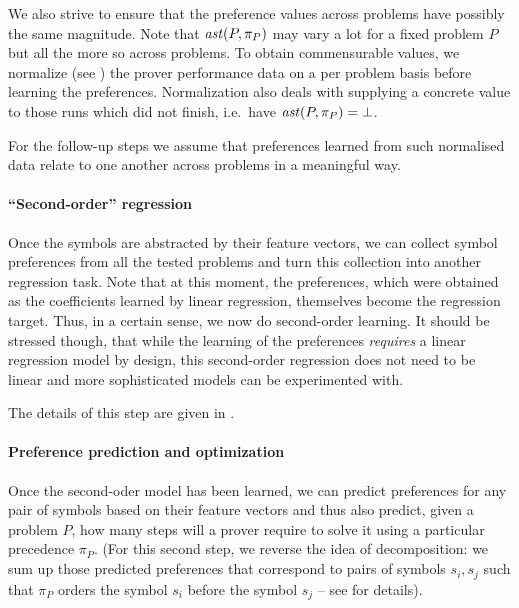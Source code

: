 We also strive to ensure that the preference values across problems have possibly the same magnitude.
Note that \(\operatorname{\mathit{ast}}(P,\pi_P)\) may vary a lot for a fixed problem \(P\) but all the more so across
problems. To obtain commensurable values, we normalize
(see ) the prover performance data
on a per problem basis before learning the preferences. Normalization also deals with
supplying a concrete value to those runs which did not finish, i.e.~have \(\operatorname{\mathit{ast}}(P,\pi_P) = \bot\).

For the follow-up steps we assume that preferences learned from such normalised data relate to one another
across problems in a meaningful way.

\paragraph{``Second-order'' regression}
Once the symbols are abstracted by their feature vectors, we can collect symbol preferences from all the tested problems
and turn this collection into another regression task. 
Note that at this moment, the preferences, which were obtained as the coefficients learned by linear regression,
themselves become the regression target. Thus, in a certain sense, we now do second-order learning.
It should be stressed though, that while the learning of the preferences \emph{requires} a linear regression model by design,
this second-order regression does not need to be linear and more sophisticated models can be experimented with. 

The details of this step are given in .

\paragraph{Preference prediction and optimization} Once the second-oder model has been learned, we can predict 
preferences for any pair of symbols based on their feature vectors and thus also predict,
given a problem $P$, how many steps will a prover require to solve it using a particular precedence $\pi_P$.
(For this second step, we reverse the idea of decomposition:
we sum up those predicted preferences that correspond to pairs of symbols $s_i,s_j$
such that $\pi_P$ orders the symbol $s_i$ before the symbol $s_j$ -- see  for details).

